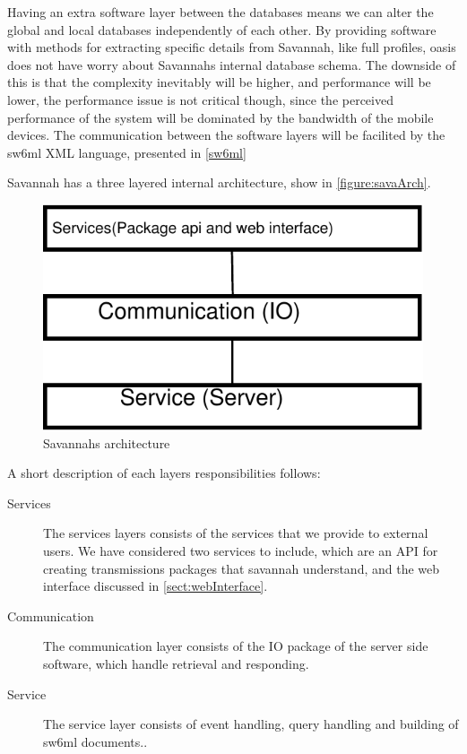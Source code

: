 Having an extra software layer between the databases means we can alter the global and local databases independently of each other. By providing software with methods for extracting specific
details from Savannah, like full profiles, oasis does not have worry about Savannahs internal database schema. The downside of this is that the complexity inevitably will be higher, and performance
will be lower, the performance issue is not critical though, since the perceived performance of the system will be dominated by the bandwidth of the mobile devices. 
The communication between the software layers will be facilited by the sw6ml XML language, presented in \autoref{sw6ml}

Savannah has a three layered internal architecture, show in \autoref{figure:savaArch}.

\begin{figure}[H]
  \centering
    \includegraphics{images/savaArch}
  \caption{Savannahs architecture}
  \label{figure:savaArch}
\end{figure}

A short description of each layers responsibilities follows:

\begin{description}
 \item[Services] The services layers consists of the services that we provide to external users. We have considered two services to include, which are an API for creating transmissions packages	 		that savannah understand, and the web interface discussed in \autoref{sect:webInterface}.
 \item[Communication] The communication layer consists of the IO package of the server side software, which handle retrieval and responding.
 \item[Service] The service layer consists of event handling, query handling and building of sw6ml documents..
\end{description}


